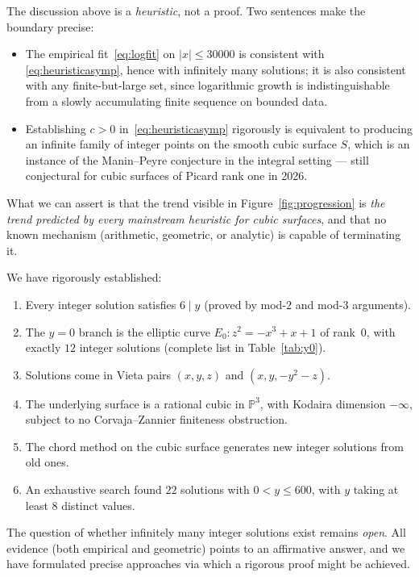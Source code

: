 \documentclass[12pt,a4paper]{article}
\theoremstyle{definition}
\newcommand{\Pbb}{\mathbb{P}}
\begin{document}
The discussion above is a \emph{heuristic}, not a proof.  Two
sentences make the boundary precise:
\begin{itemize}
  \item The empirical fit~\eqref{eq:logfit} on $|x|\le 30000$ is
    consistent with \eqref{eq:heuristicasymp}, hence with infinitely
    many solutions; it is also consistent with any finite-but-large
    set, since logarithmic growth is indistinguishable from a slowly
    accumulating finite sequence on bounded data.
  \item Establishing $c>0$ in~\eqref{eq:heuristicasymp} rigorously is
    equivalent to producing an infinite family of integer points on
    the smooth cubic surface $S$, which is an instance of the
    Manin--Peyre conjecture in the integral setting --- still
    conjectural for cubic surfaces of Picard rank one in 2026.
\end{itemize}
What we can assert is that the trend visible in
Figure~\ref{fig:progression} is \emph{the trend predicted by every
mainstream heuristic for cubic surfaces}, and that no known mechanism
(arithmetic, geometric, or analytic) is capable of terminating it.



We have rigorously established:
\begin{enumerate}
  \item Every integer solution satisfies $6\mid y$ (proved by mod-$2$ and mod-$3$ arguments).
  \item The $y=0$ branch is the elliptic curve $E_0: z^2=-x^3+x+1$ of rank~$0$,
        with exactly $12$ integer solutions (complete list in Table~\ref{tab:y0}).
  \item Solutions come in Vieta pairs $(x,y,z)$ and $(x,y,-y^2-z)$.
  \item The underlying surface is a rational cubic in $\Pbb^3$, with Kodaira
        dimension $-\infty$, subject to no Corvaja--Zannier finiteness obstruction.
  \item The chord method on the cubic surface generates new integer solutions from old ones.
  \item An exhaustive search found $22$ solutions with $0<y\le600$, with $y$ taking
        at least $8$ distinct values.
\end{enumerate}

\noindent
The question of whether infinitely many integer solutions exist remains
\emph{open}.  All evidence (both empirical and geometric) points to an
affirmative answer, and we have formulated precise approaches via which a
rigorous proof might be achieved.
\end{document}
